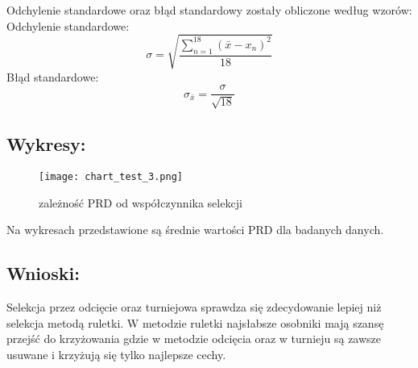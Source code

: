     Odchylenie standardowe oraz błąd standardowy zostały obliczone według wzorów: \\
    Odchylenie standardowe:
    \[ \sigma = \sqrt{\frac{\sum_{n = 1}^{18}(\bar{x} - x_n)^2}{18}} \]
    Błąd standardowe:
    \[ \sigma_{\bar{x}} = \frac{\sigma}{\sqrt{18}} \]

  \subsection{Wykresy: }
    \begin{figure}[H]
      \texttt{[image: chart\_test\_3.png]}
      \centering
      \caption{zależność PRD od współczynnika selekcji}
    \end{figure}
  
    Na wykresach przedstawione są średnie wartości PRD dla badanych danych.
  \subsection{Wnioski: }
  Selekcja przez odcięcie oraz turniejowa sprawdza się zdecydowanie lepiej niż selekcja metodą ruletki. W metodzie ruletki najsłabsze osobniki mają szansę przejść do krzyżowania gdzie w metodzie odcięcia oraz w turnieju są zawsze usuwane i krzyżują się tylko najlepsze cechy.
